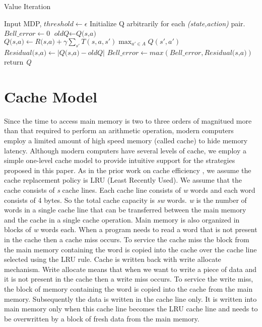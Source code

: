 \documentclass[conference]{IEEEtran}
\begin{document}
\begin{algorithm}
\caption{Value Iteration}
\label{alg:VI}
\begin{algorithmic}[1]
\State Input MDP, $threshold \gets \epsilon$
\State Initialize Q arbitrarily for each \textit{(state,action)} pair.
	\State $\textit{Bell\_error} \leftarrow 0$
		\State $\textit{oldQ} \leftarrow \textit{Q(s,a)}$
		\State $\textit{Q(s,a)} \leftarrow \textit{R(s,a)} + \gamma \sum\limits_{s'} T(s,a,s')  {\displaystyle\max_{a'\in A} } Q(s',a')$
		\State $\textit{Residual(s,a)} \leftarrow |\textit{Q(s,a)} - \textit{oldQ}|$
		\State $\textit{Bell\_error} \leftarrow max(\textit{Bell\_error} , \textit{Residual(s,a)})$
	\EndFor
		\State return \textit{Q}
	\EndIf
\EndWhile
\end{algorithmic}
\end{algorithm}

\section{Cache Model}
\label{sec:CacheModel}
Since the time to access main memory is two to three orders of magnitued more than that required to perform an arithmetic operation, modern computers employ a limited amount of high speed memory (called cache) to hide memory latency. Although modern computers have several levels of cache, we employ a simple one-level cache model to provide intuitive support for the strategies proposed in this paper.
As in the prior work on cache efficiency \cite{chunchun-sahni}, we assume the cache replacement policy is LRU (Least Recently Used). We assume that the cache consists of \textit{s} cache lines. Each cache line consists of \textit{w} words and each word consists of 4 bytes. So the total cache capacity is \textit{sw} words. \textit{w} is the number of words in a single cache line that can be transferred between the main memory and the cache in a single cache operation. Main memory is also organized in blocks of \textit{w} words each. When a program needs to read a word that is not present in the cache then a cache miss occurs. To service the cache miss the block from the main memory containing the word is copied into the cache over the cache line selected using the LRU rule. Cache is written back with write allocate mechanism. Write allocate means that when we want to write a piece of data and it is not present in the cache then a write miss occurs. To service the write miss, the block of memory containing the word is copied into the cache from the main memory. Subsequently the data is written in the cache line only. It is written into main memory only when this cache line becomes the LRU cache line and needs to be overwritten by a block of fresh data from the main memory.
\end{document}

